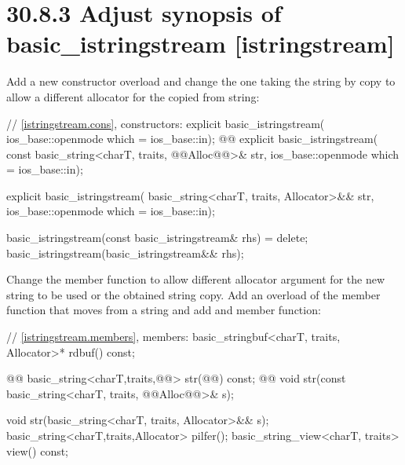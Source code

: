 \documentclass[ebook,11pt,article]{memoir}
\begin{document}
\section{30.8.3 Adjust synopsis of basic\_istringstream [istringstream]}
Add a new constructor overload and change the one taking the string by copy to allow a different allocator for the copied from string:
\begin{codeblock}
    // \ref{istringstream.cons}, constructors:
    explicit basic_istringstream(
      ios_base::openmode which = ios_base::in);
    @@
    explicit basic_istringstream(
      const basic_string<charT, traits, @@Alloc@@>& str,
      ios_base::openmode which = ios_base::in);
\end{codeblock}
\begin{addedblock}
\begin{codeblock}
    explicit basic_istringstream(
      basic_string<charT, traits, Allocator>&& str,
      ios_base::openmode which = ios_base::in);
\end{codeblock}
\end{addedblock}
\begin{codeblock}
    basic_istringstream(const basic_istringstream& rhs) = delete;
    basic_istringstream(basic_istringstream&& rhs);
\end{codeblock}

Change the  member function to allow different allocator argument for the new string to be used or the obtained string copy.
Add an overload of the  member function that moves from a string and add  and  member function:

\begin{codeblock}
    // \ref{istringstream.members}, members:
    basic_stringbuf<charT, traits, Allocator>* rdbuf() const;

    @@
    basic_string<charT,traits,@@> str(@@) const;
    @@
    void str(const basic_string<charT, traits, @@Alloc@@>& s);
\end{codeblock}
\begin{addedblock}
\begin{codeblock}
    void str(basic_string<charT, traits, Allocator>&& s);
    basic_string<charT,traits,Allocator> pilfer();
    basic_string_view<charT, traits> view() const;
\end{codeblock}
\end{addedblock}
\end{document}
